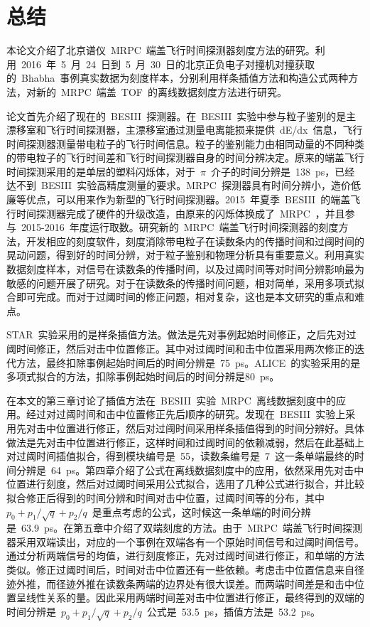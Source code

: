 \chapter{总结}
本论文介绍了北京谱仪~MRPC~端盖飞行时间探测器刻度方法的研究。利用~2016~年~5~月~24~日到~5~月~30~日的北京正负电子对撞机对撞获取的~Bhabha~事例真实数据为刻度样本，分别利用样条插值方法和构造公式两种方法，对新的~MRPC~端盖~TOF~的离线数据刻度方法进行研究。

论文首先介绍了现在的~BESIII~探测器。在~BESIII~实验中参与粒子鉴别的是主漂移室和飞行时间探测器，主漂移室通过测量电离能损来提供~dE/dx~信息，飞行时间探测器测量带电粒子的飞行时间信息。粒子的鉴别能力由相同动量的不同种类的带电粒子的飞行时间差和飞行时间探测器自身的时间分辨决定。原来的端盖飞行时间探测采用的是单层的塑料闪烁体，对于~$\pi$~介子的时间分辨是~138~ps，已经达不到~BESIII~实验高精度测量的要求。MRPC~探测器具有时间分辨小，造价低廉等优点，可以用来作为新型的飞行时间探测器。2015~年夏季~BESIII~的端盖飞行时间探测器完成了硬件的升级改造，由原来的闪烁体换成了~MRPC~，并且参与~2015-2016~年度运行取数。研究新的~MRPC~端盖飞行时间探测器的刻度方法，开发相应的刻度软件，刻度消除带电粒子在读数条内的传播时间和过阈时间的晃动问题，得到好的时间分辨，对于粒子鉴别和物理分析具有重要意义。利用真实数据刻度样本，对信号在读数条的传播时间，以及过阈时间等对时间分辨影响最为敏感的问题开展了研究。对于在读数条的传播时间问题，相对简单，采用多项式拟合即可完成。而对于过阈时间的修正问题，相对复杂，这也是本文研究的重点和难点。

STAR~实验采用的是样条插值方法。做法是先对事例起始时间修正，之后先对过阈时间修正，然后对击中位置修正。其中对过阈时间和击中位置采用两次修正的迭代方法，最终扣除事例起始时间后的时间分辨是~75~ps。ALICE~的实验采用的是多项式拟合的方法，扣除事例起始时间后的时间分辨是80~ps。

在本文的第三章讨论了插值方法在~BESIII~实验~MRPC~离线数据刻度中的应用。经过对过阈时间和击中位置修正先后顺序的研究。发现在~BESIII~实验上采用先对击中位置进行修正，然后对过阈时间采用样条插值得到的时间分辨好。具体做法是先对击中位置进行修正，这样时间和过阈时间的依赖减弱，然后在此基础上对过阈时间插值拟合，得到模块编号是~55，读数条编号是~7~这一条单端最终的时间分辨是~64~ps。第四章介绍了公式在离线数据刻度中的应用，依然采用先对击中位置进行刻度，然后对过阈时间采用公式拟合，选用了几种公式进行拟合，并比较拟合修正后得到的时间分辨和时间对击中位置，过阈时间等的分布，其中~${p_{0}+p_{1}/\sqrt{q}+p_{2}/q}$~是重点考虑的公式，这时候这一条单端的时间分辨是~63.9~ps。在第五章中介绍了双端刻度的方法。由于~MRPC~端盖飞行时间探测器采用双端读出，对应的一个事例在双端各有一个原始时间信号和过阈时间信号。通过分析两端信号的均值，进行刻度修正，先对过阈时间进行修正，和单端的方法类似。修正过阈时间后，时间对击中位置还有一些依赖。考虑击中位置信息来自径迹外推，而径迹外推在读数条两端的边界处有很大误差。而两端时间差是和击中位置呈线性关系的量。因此采用两端时间差对击中位置进行修正，最终得到的双端的时间分辨是~${p_{0}+p_{1}/\sqrt{q}+p_{2}/q}$~公式是~53.5~ps，插值方法是~53.2~ps。

